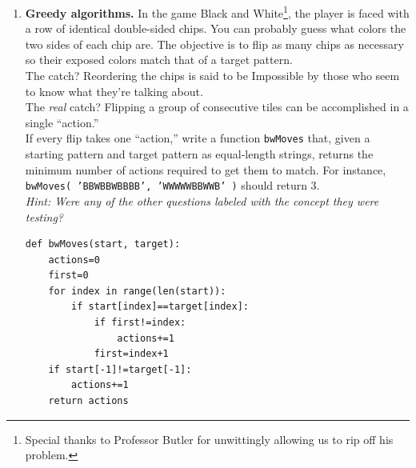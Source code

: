 \documentclass[11pt]{article}
\newenvironment{answer}{\large\lstset{basicstyle=\large}\color{white}}{}
\newenvironment{answer}{\large\lstset{basicstyle=\large}\color{red}}{}
\begin{document}
\begin{enumerate}
\item
\textbf{Greedy algorithms.}
In the game Black and White\footnote{Special thanks to Professor Butler for unwittingly allowing us to rip off his problem.}, the player is faced with a row of identical double-sided chips.
You can probably guess what colors the two sides of each chip are.
The objective is to flip as many chips as necessary so their exposed colors match that of a target pattern. \\
The catch?
Reordering the chips is said to be Impossible by those who seem to know what they're talking about. \\
The \textit{real} catch?
Flipping a group of consecutive tiles can be accomplished in a single ``action.'' \\
If every flip takes one ``action,'' write a function \texttt{bwMoves} that, given a starting pattern and target pattern as equal-length strings, returns the minimum number of actions required to get them to match.
For instance, \texttt{bwMoves( 'BBWBBWBBBB', 'WWWWWBBWWB' )} should return 3.
\vspace{6pt} \\
\textit{Hint: Were any of the other questions labeled with the concept they were testing?}
\begin{answer}
\begin{lstlisting}
def bwMoves(start, target):
	actions=0
	first=0
	for index in range(len(start)):
		if start[index]==target[index]:
			if first!=index:
				actions+=1
			first=index+1
	if start[-1]!=target[-1]:
		actions+=1
	return actions
\end{lstlisting}
\end{answer}

\end{enumerate}
\end{document}
